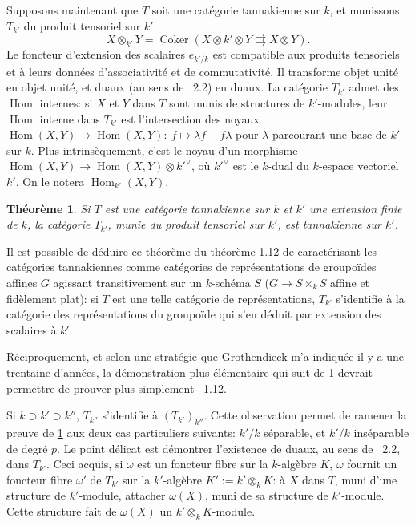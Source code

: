 \documentclass[11pt,a4paper]{article}
\theoremstyle{plain}
\newtheorem{theorem}{Th\'eor\`eme}[section]
\theoremstyle{definition}
\DeclareMathOperator{\Hom}{Hom}
\DeclareMathOperator{\Coker}{Coker}
\begin{document}
\subsection{}
Supposons maintenant que $T$ soit une cat\'egorie tannakienne sur $k$, et munissons $T_{k'}$ du produit tensoriel sur $k'$:
\[
X \otimes_{k'} Y = \Coker(X \otimes k' \otimes Y \rightrightarrows X \otimes Y).
\]
Le foncteur d'extension des scalaires $e_{k'/k}$ est compatible aux produits tensoriels et \`a leurs donn\'ees d'associativit\'e et de commutativit\'e. Il transforme objet unit\'e en objet unit\'e, et duaux (au sens de \cite{Deligne1990}~2.2) en duaux. La cat\'egorie $T_{k'}$ admet des $\Hom$ internes: si $X$ et $Y$ dans $T$ sont munis de structures de $k'$-modules, leur $\Hom$ interne dans $T_{k'}$ est l'intersection des noyaux $\Hom(X, Y) \to \Hom(X, Y):\ f \mapsto \lambda f - f \lambda$ pour $\lambda$ parcourant une base de $k'$ sur $k$. Plus intrins\`equement, c'est le noyau d'un morphisme $\Hom(X, Y) \to \Hom(X, Y) \otimes k'^{\vee}$, o\`u $k'^{\vee}$ est le $k$-dual du $k$-espace vectoriel $k'$. On le notera $\Hom_{k'}(X, Y)$.

\begin{theorem}\label{thm:4.4}
Si $T$ est une cat\'egorie tannakienne sur $k$ et $k'$ une extension finie de $k$, la cat\'egorie $T_{k'}$, munie du produit tensoriel sur $k'$, est tannakienne sur $k'$.
\end{theorem}

Il est possible de d\'eduire ce th\'eor\`eme du th\'eor\`eme 1.12 de \cite{Deligne1990} caract\'erisant les cat\'egories tannakiennes comme cat\'egories de repr\'esentations de groupo\"ides affines $G$ agissant transitivement sur un $k$-sch\'ema $S$ ($G \to S \times_k S$ affine et fid\`element plat): si $T$ est une telle cat\'egorie de repr\'esentations, $T_{k'}$ s'identifie \`a la cat\'egorie des repr\'esentations du groupo\"ide qui s'en d\'eduit par extension des scalaires \`a $k'$.

R\'eciproquement, et selon une strat\'egie que Grothendieck m'a indiqu\'ee il y a une trentaine d'ann\'ees, la d\'emonstration plus \'el\'ementaire qui suit de \ref{thm:4.4} devrait permettre de prouver plus simplement \cite{Deligne1990}~1.12.

Si $k \supset k' \supset k''$, $T_{k''}$ s'identifie \`a $(T_{k'})_{k''}$. Cette observation permet de ramener la preuve de \ref{thm:4.4} aux deux cas particuliers suivants: $k'/k$ s\'eparable, et $k'/k$ ins\'eparable de degr\'e $p$. Le point d\'elicat est d\'emontrer l'existence de duaux, au sens de \cite{Deligne1990}~2.2, dans $T_{k'}$. Ceci acquis, si $\omega$ est un foncteur fibre sur la $k$-alg\`ebre $K$, $\omega$ fournit un foncteur fibre $\omega'$ de $T_{k'}$ sur la $k'$-alg\`ebre $K' := k' \otimes_k K$: \`a $X$ dans $T$, muni d'une structure de $k'$-module, attacher $\omega(X)$, muni de sa structure de $k'$-module. Cette structure fait de $\omega(X)$ un $k' \otimes_k K$-module.
\end{document}

